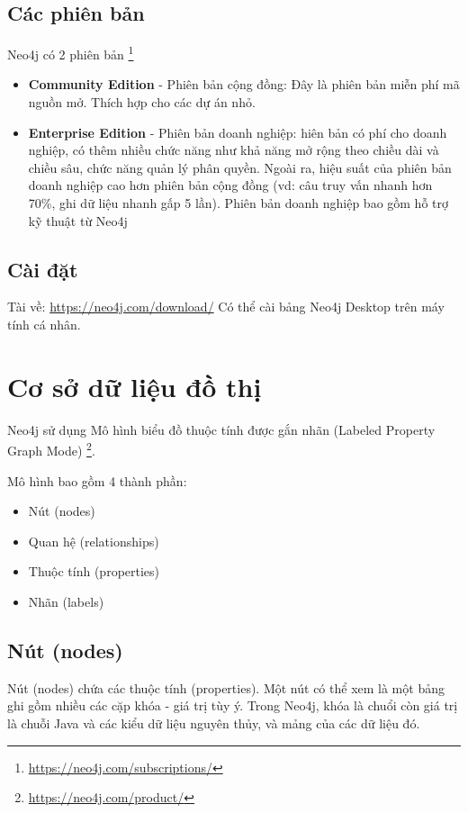 \subsection{Các phiên bản}
Neo4j có 2 phiên bản \footnote{\url{https://neo4j.com/subscriptions/}}

\begin{itemize}
\item \textbf{Community Edition} - Phiên bản cộng đồng: Đây là phiên bản miễn phí mã nguồn mở. Thích hợp cho các dự án nhỏ.
\item \textbf{Enterprise Edition} - Phiên bản doanh nghiệp: hiên bản có phí cho doanh nghiệp, có thêm nhiều chức năng như khả năng mở rộng theo chiều dài và chiều sâu, chức năng quản lý phân quyền. Ngoài ra, hiệu suất của phiên bản doanh nghiệp cao hơn phiên bản cộng đồng (vd: câu truy vấn nhanh hơn 70\%, ghi dữ liệu nhanh gấp 5 lần). Phiên bản doanh nghiệp bao gồm hỗ trợ kỹ thuật từ Neo4j 
\end{itemize}

\subsection{Cài đặt}
Tài về:  \url{https://neo4j.com/download/}  
Có thể cài bảng Neo4j Desktop trên máy tính cá nhân. 


\section{Cơ sở dữ liệu đồ thị}
Neo4j sử dụng Mô hình biểu đồ thuộc tính được gắn nhãn (Labeled Property Graph Mode) \footnote{\url{https://neo4j.com/product/}}. 

Mô hình bao gồm 4 thành phần: 

\begin{itemize}
\item Nút (nodes)
\item Quan hệ (relationships)
\item Thuộc tính  (properties)
\item Nhãn (labels)
\end{itemize}

\subsection{Nút (nodes)}
Nút (nodes) chứa các thuộc tính (properties). Một nút có thể xem là một bảng ghi gồm nhiều các cặp khóa - giá trị tùy ý. Trong Neo4j, khóa là chuổi còn giá trị là chuỗi Java và các kiểu dữ liệu nguyên thủy, và mảng của các dữ liệu đó. 

